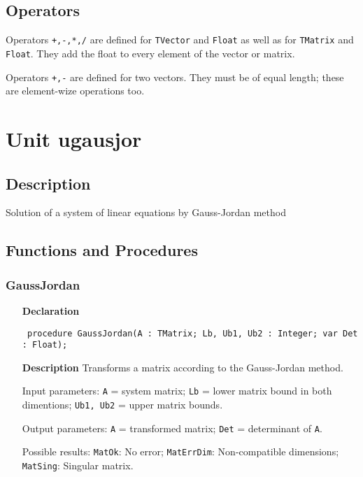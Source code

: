 \documentclass[12pt,a4paper,oneside]{report}
\newcommand{\declarationitem}[1]{\textbf{#1}}
\newcommand{\descriptiontitle}[1]{\textbf{#1}}
\newcommand{\code}[1]{\texttt{#1}}
\begin{document}
\subsection{Operators}
Operators \code{+,-,*,/} are defined for \code{TVector} and \code{Float} as well as for \code{TMatrix} and \code{Float}. They add the float to every element of the vector or matrix.

Operators \code{+,-} are defined for two vectors. They must be of equal length; these are element-wize operations too.
 
\section{Unit ugausjor}
\label{ugausjor}
\subsection{Description}
Solution of a system of linear equations by Gauss{-}Jordan method
\subsection{Functions and Procedures}
\subsubsection{GaussJordan}
\label{ugausjor-GaussJordan}
\begin{itemize}\item[\declarationitem{Declaration}\hfill]
	\begin{flushleft}
		\code{
			procedure GaussJordan(A : TMatrix; Lb, Ub1, Ub2 : Integer; var Det : Float);}
		
	\end{flushleft}
	
	\par
	\item[\descriptiontitle{Description}]
	Transforms a matrix according to the Gauss{-}Jordan method.
	
	Input parameters: \code{A} = system matrix; \code{Lb} = lower matrix bound in both dimentions; \code{Ub1, Ub2} = upper matrix bounds.
	
	Output parameters: \code{A} = transformed matrix; \code{Det} = determinant of \code{A}.
	
	Possible results: \code{MatOk}: No error; \code{MatErrDim}: Non{-}compatible dimensions; \code{MatSing}: Singular matrix.
	
\end{itemize}
\end{document}
